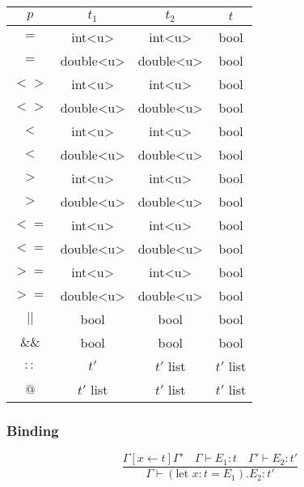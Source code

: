 \documentclass[]{article}
\begin{document}
\begin{itemize}
			\begin{center}
				\begin{tabular}{| c || c | c | c |} 
					\hline
					$p$ & $t_1$ & $t_2$ & $t$ \\ [0.5ex] 
					\hline\hline
					$=$ & int\textless u\textgreater & int\textless u\textgreater & bool \\ 
					\hline
					$=$ & double\textless u\textgreater & double\textless u\textgreater & bool \\ 
					\hline
					$<>$ & int\textless u\textgreater & int\textless u\textgreater & bool \\ 
					\hline
					$<>$ & double\textless u\textgreater & double\textless u\textgreater & bool \\ 
					\hline
					$<$ & int\textless u\textgreater & int\textless u\textgreater & bool \\ 
					\hline
					$<$ & double\textless u\textgreater & double\textless u\textgreater & bool \\ 
					\hline
					$>$ & int\textless u\textgreater & int\textless u\textgreater & bool \\ 
					\hline
					$>$ & double\textless u\textgreater & double\textless u\textgreater & bool \\ 
					\hline
					$<=$ & int\textless u\textgreater & int\textless u\textgreater & bool \\ 
					\hline
					$<=$ & double\textless u\textgreater & double\textless u\textgreater & bool \\ 
					\hline
					$>=$ & int\textless u\textgreater & int\textless u\textgreater & bool \\ 
					\hline
					$>=$ & double\textless u\textgreater & double\textless u\textgreater & bool \\ 
					\hline
					$||$ & bool & bool & bool \\ 
					\hline
					$\&\&$ & bool & bool & bool \\  
					\hline
					$::$ & $t'$ & $t'$ list & $t'$ list \\  
					\hline
					$@$ & $t'$ list & $t'$ list & $t'$ list \\  
					\hline
				\end{tabular}
			\end{center}
		\end{itemize}
		
		\subsubsection{Binding}
		\[
		\frac{\Gamma[x \leftarrow t]\Gamma' \quad \Gamma \vdash E_1: t \quad \Gamma' 	\vdash E_2: t'}{\Gamma \vdash (\text{let } x : t = E_1).E_2: t'}
		\]
		
\end{document}
